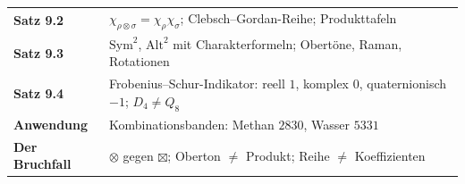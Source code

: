 \begin{merksatz}
\begin{center}
\renewcommand{\arraystretch}{1.5}
\begin{tabular}{@{}P{3.0cm}P{5.6cm}@{}}
\toprule
\textbf{Satz 9.2} & $\chi_{\rho\otimes\sigma} = \chi_\rho\chi_\sigma$; Clebsch--Gordan-Reihe; Produkttafeln\\
\textbf{Satz 9.3} & $\mathrm{Sym}^{2}$, $\mathrm{Alt}^{2}$ mit Charakterformeln; Obertöne, Raman, Rotationen\\
\textbf{Satz 9.4} & Frobenius--Schur-Indikator: reell $1$, komplex $0$, quaternionisch $-1$; $D_4\neq Q_8$\\
\textbf{Anwendung} & Kombinationsbanden: Methan $2830$, Wasser $5331$\\
\textbf{Der Bruchfall} & $\otimes$ gegen $\boxtimes$; Oberton $\neq$ Produkt; Reihe $\neq$ Koeffizienten\\
\bottomrule
\end{tabular}
\end{center}

\begin{center}
\begin{minipage}{0.88\textwidth}
\end{minipage}
\end{center}
\end{merksatz}
